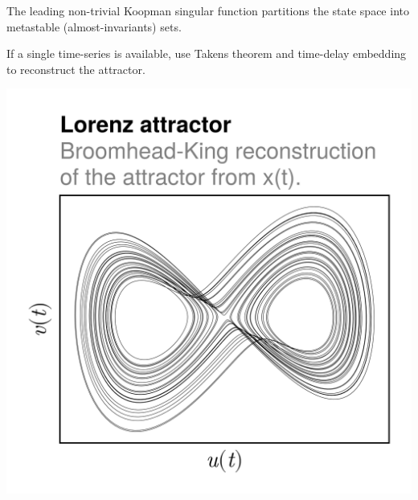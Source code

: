 \documentclass[aspectratio=169, usenames, dvipsnames]{beamer}
\begin{document}
{\begin{frame}
    The leading non-trivial Koopman singular function partitions the state space into metastable (almost-invariants) sets.
    \vfill
  \end{frame}

  \begin{frame}
    \vfill
    \begin{minipage}{.48\textwidth}
      If a single time-series is available, use Takens theorem and time-delay embedding to reconstruct the attractor.
    \end{minipage}%
    \hfill
    \begin{minipage}{.48\textwidth}
      \centering
      \includegraphics[width=\textwidth]{Lorenz_attractor_reconstruction}
    \end{minipage}
    \vfill
  \end{frame}

}
\end{document}
